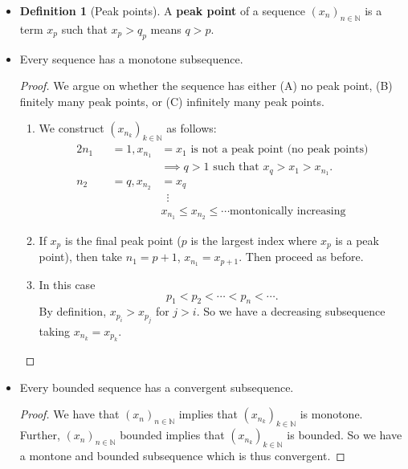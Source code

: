 \documentclass{article}
\newcommand{\N}{\mathbb{N}}
\newcommand{\seq}[2]{(#1_{#2})_{#2 \in \N}}
\newcommand{\?}{\stackrel{?}{=}}
\theoremstyle{definition} %
\newtheorem{definition}[subsection]{Definition} %
\begin{document}
\begin{itemize}
    \item[]
    \begin{definition}[Peak points]
        A \textbf{peak point} of a sequence $\seq{x}{n}$ is a term $x_p$ such that $x_p > q_p$ means $q > p$.
    \end{definition}
    \item[]
    \begin{lemma}
        Every sequence has a monotone subsequence.
    \end{lemma}
    \begin{proof}
        We argue on whether the sequence has either (A) no peak point, (B) finitely many peak points, or (C) infinitely many peak points.
        \begin{enumerate}[label=(\Alph*)]
            \item We construct $(x_{n_k})_{k \in \N}$ as follows:
            \begin{alignat*}{2}
                n_1 &&= 1, x_{n_1} &= x_1 \text{ is not a peak point (no peak points)} \\
                && &\implies q>1 \text{ such that } x_q > x_1 > x_{n_1}. \\
                n_2 &&= q, x_{n_2} &= x_q \\
                && &\hspace{6pt}\vdots \\
                && & x_{n_1} \leq x_{n_2} \leq \cdots \text{montonically increasing}
            \end{alignat*}
            \item If $x_p$ is the final peak point ($p$ is the largest index where $x_p$ is a peak point), then take $n_1 = p + 1$, $x_{n_1} = x_{p + 1}$. Then proceed as before.
            \item In this case
            $$p_1 < p_2 < \cdots < p_n < \cdots.$$
            By definition, $x_{p_i} > x_{p_j}$ for $j > i$. So we have a decreasing subsequence taking $x_{n_k} = x_{p_k}$.
        \end{enumerate}
    \end{proof}
    \item[]
    \begin{theorem}
        Every bounded sequence has a convergent subsequence.
    \end{theorem}
    \begin{proof}
        We have that $\seq{x}{n}$ implies that $(x_{n_k})_{k \in \N}$ is monotone. Further, $\seq{x}{n}$ bounded implies that $(x_{n_k})_{k \in \N}$ is bounded. So we have a montone and bounded subsequence which is thus convergent.

\end{proof}
\end{itemize}
\end{document}
